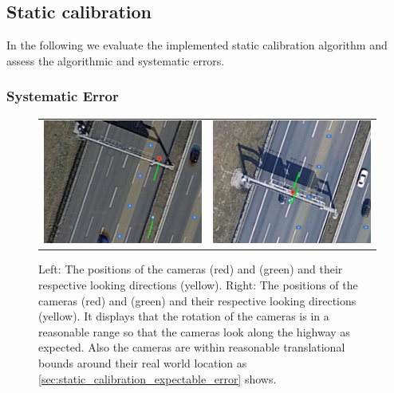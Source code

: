 
\subsection{Static calibration}
In the following we evaluate the implemented static calibration algorithm and assess the algorithmic and systematic errors.

\subsubsection{Systematic Error}

\begin{figure}[t]
    \centering
    \begin{tabular}{cc}
      \includegraphics[width=0.45 \linewidth]{images/calibration/google_maps_s50_s.png} &
      \includegraphics[width=0.45 \linewidth]{images/calibration/google_maps_s40_n.png} 
  \end{tabular}
  \caption{Left: The positions of the cameras  (red) and  (green) and their respective looking directions (yellow). 
  Right: The positions of the cameras  (red) and  (green) and their respective looking directions (yellow). 
  It displays that the rotation of the cameras is in a reasonable range so that the cameras look along the highway as expected. 
  Also the cameras are within reasonable translational bounds around their real world location as \autoref{sec:static_calibration_expectable_error} shows.
  }
  \label{fig:google_maps}
  \end{figure}

